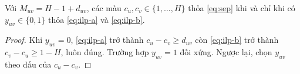 \begin{proposition}\label{prop:ilp}
Với $M_{uv}=H-1+d_{uv}$, các màu $c_u,c_v\in\{1,\dots,H\}$ thỏa \eqref{eq:sep} khi và chỉ khi có $y_{uv}\in\{0,1\}$ thỏa \eqref{eq:ilp-a} và \eqref{eq:ilp-b}.
\end{proposition}
\begin{proof}
Khi $y_{uv}=0$, \eqref{eq:ilp-a} trở thành $c_u-c_v\ge d_{uv}$ còn \eqref{eq:ilp-b} trở thành $c_v-c_u\ge 1-H$, luôn đúng. Trường hợp $y_{uv}=1$ đối xứng. Ngược lại, chọn $y_{uv}$ theo dấu của $c_u-c_v$.
\end{proof}
